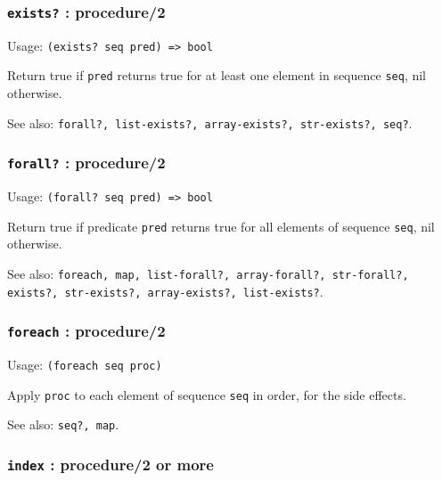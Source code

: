 \documentclass[
]{article}
\newcommand{\passthrough}[1]{#1}
\begin{document}
\hypertarget{exists-procedure2}{%
\subsubsection{\texorpdfstring{\texttt{exists?} :
procedure/2}{exists? : procedure/2}}\label{exists-procedure2}}

Usage: \passthrough{\lstinline!(exists? seq pred) => bool!}

Return true if \passthrough{\lstinline!pred!} returns true for at least
one element in sequence \passthrough{\lstinline!seq!}, nil otherwise.

See also:
\passthrough{\lstinline!forall?, list-exists?, array-exists?, str-exists?, seq?!}.

\hypertarget{forall-procedure2}{%
\subsubsection{\texorpdfstring{\texttt{forall?} :
procedure/2}{forall? : procedure/2}}\label{forall-procedure2}}

Usage: \passthrough{\lstinline!(forall? seq pred) => bool!}

Return true if predicate \passthrough{\lstinline!pred!} returns true for
all elements of sequence \passthrough{\lstinline!seq!}, nil otherwise.

See also:
\passthrough{\lstinline!foreach, map, list-forall?, array-forall?, str-forall?, exists?, str-exists?, array-exists?, list-exists?!}.

\hypertarget{foreach-procedure2}{%
\subsubsection{\texorpdfstring{\texttt{foreach} :
procedure/2}{foreach : procedure/2}}\label{foreach-procedure2}}

Usage: \passthrough{\lstinline!(foreach seq proc)!}

Apply \passthrough{\lstinline!proc!} to each element of sequence
\passthrough{\lstinline!seq!} in order, for the side effects.

See also: \passthrough{\lstinline!seq?, map!}.

\hypertarget{index-procedure2-or-more}{%
\subsubsection{\texorpdfstring{\texttt{index} : procedure/2 or
more}{index : procedure/2 or more}}\label{index-procedure2-or-more}}
\end{document}
